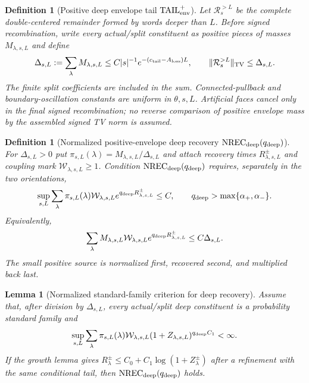 \documentclass[11pt]{article}
\newtheorem{lemma}[theorem]{Lemma}
\newtheorem{definition}[theorem]{Definition}
\begin{document}
\begin{definition}[Positive deep envelope tail
$\mathrm{TAIL}_{\rm env}^{+}$]
\label{def:deep-envelope-tail}
Let $\mathcal R_s^{>L}$ be the complete double-centered remainder formed by
words deeper than $L$.  Before signed recombination, write every actual/split
constituent as positive pieces of masses $M_{\lambda,s,L}$ and define
\begin{equation}
\label{eq:deep-positive-envelope-mass}
 \Delta_{s,L}:=\sum_\lambda M_{\lambda,s,L}
 \le C|s|^{-1}e^{-(c_{\rm tail}-A_{\rm loss})L},
 \qquad
 \|\mathcal R_s^{>L}\|_{\rm TV}\le\Delta_{s,L}.
\end{equation}
The finite split coefficients are included in the sum.  Connected-pullback
and boundary-oscillation constants are uniform in $\theta,s,L$.
Artificial faces cancel only in the final signed recombination; no reverse
comparison of positive envelope mass by the assembled signed TV norm is
assumed.
\end{definition}

\begin{definition}[Normalized positive-envelope deep recovery
$\mathrm{NREC}_{\rm deep}(q_{\rm deep})$]
\label{def:normalized-deep-recovery}
For $\Delta_{s,L}>0$ put
$\pi_{s,L}(\lambda)=M_{\lambda,s,L}/\Delta_{s,L}$ and attach recovery
times $R^\pm_{\lambda,s,L}$ and coupling mark
$\mathcal W_{\lambda,s,L}\ge1$.  Condition
$\mathrm{NREC}_{\rm deep}(q_{\rm deep})$ requires, separately in the two
orientations,
\begin{equation}
\label{eq:normalized-deep-recovery}
 \sup_{s,L}\sum_\lambda\pi_{s,L}(\lambda)
 \mathcal W_{\lambda,s,L}e^{q_{\rm deep}R^\pm_{\lambda,s,L}}\le C,
 \qquad q_{\rm deep}>\max\{\alpha_+,\alpha_-\}.
\end{equation}
Equivalently,
\begin{equation}
\label{eq:weighted-deep-recovery}
 \sum_\lambda M_{\lambda,s,L}\mathcal W_{\lambda,s,L}
 e^{q_{\rm deep}R^\pm_{\lambda,s,L}}\le C\Delta_{s,L}.
\end{equation}
The small positive source is normalized first, recovered second, and
multiplied back last.
\end{definition}

\begin{lemma}[Normalized standard-family criterion for deep recovery]
\label{lem:normalized-deep-recovery-criterion}
Assume that, after division by $\Delta_{s,L}$, every actual/split deep
constituent is a probability standard family and
\begin{equation}
\label{eq:normalized-initial-Z-moment}
 \sup_{s,L}\sum_\lambda\pi_{s,L}(\lambda)
 \mathcal W_{\lambda,s,L}
 (1+Z_{\lambda,s,L})^{q_{\rm deep}C_1}<\infty .
\end{equation}
If the growth lemma gives
$R^\pm_\lambda\le C_0+C_1\log(1+Z^\pm_\lambda)$ after a refinement with
the same conditional tail, then
$\mathrm{NREC}_{\rm deep}(q_{\rm deep})$ holds.
\end{lemma}
\end{document}
